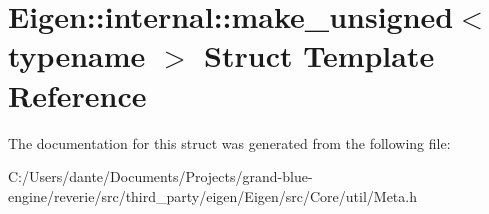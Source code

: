 \hypertarget{struct_eigen_1_1internal_1_1make__unsigned}{}\section{Eigen\+::internal\+::make\+\_\+unsigned$<$ typename $>$ Struct Template Reference}
\label{struct_eigen_1_1internal_1_1make__unsigned}


The documentation for this struct was generated from the following file\+:\begin{DoxyCompactItemize}
\item 
C\+:/\+Users/dante/\+Documents/\+Projects/grand-\/blue-\/engine/reverie/src/third\+\_\+party/eigen/\+Eigen/src/\+Core/util/Meta.\+h\end{DoxyCompactItemize}
